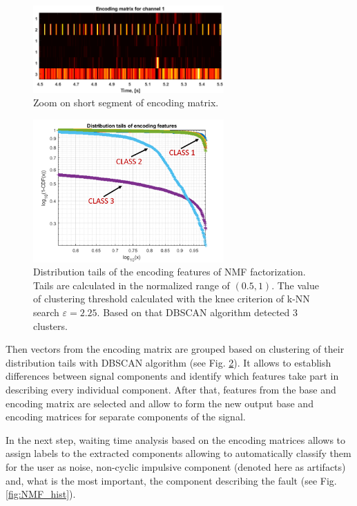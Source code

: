\documentclass[3p,times]{elsarticle}
\begin{document}
\begin{figure}[ht!]
\centering
\includegraphics[width=0.65\textwidth]{figs/mats_zoom.png}
\caption{Zoom on short segment of encoding matrix.}
\label{fig:NMF_zoom}
\end{figure}

\begin{figure}[ht!]
\centering
\includegraphics[width=0.65\textwidth]{figs/tails.png}
\caption{Distribution tails of the encoding features of NMF factorization. Tails are calculated in the normalized range of $(0.5,1)$. The value of clustering threshold calculated with the knee criterion of k-NN search $\varepsilon=2.25$. Based on that DBSCAN algorithm detected 3 clusters.}
\label{fig:NMF_tails}
\end{figure}

Then vectors from the encoding matrix are grouped based on clustering of their distribution tails with DBSCAN algorithm (see Fig. \ref{fig:NMF_tails}). It allows to establish differences between signal components and identify which features take part in describing every individual component. After that, features from the base and encoding matrix are selected and allow to form the new output base and encoding matrices for separate components of the signal. 

In the next step, waiting time analysis based on the encoding matrices allows to assign labels to the extracted components allowing to automatically classify them for the user as noise, non-cyclic impulsive component (denoted here as artifacts) and, what is the most important, the component describing the fault (see Fig. \ref{fig:NMF_hist}).
\end{document}
